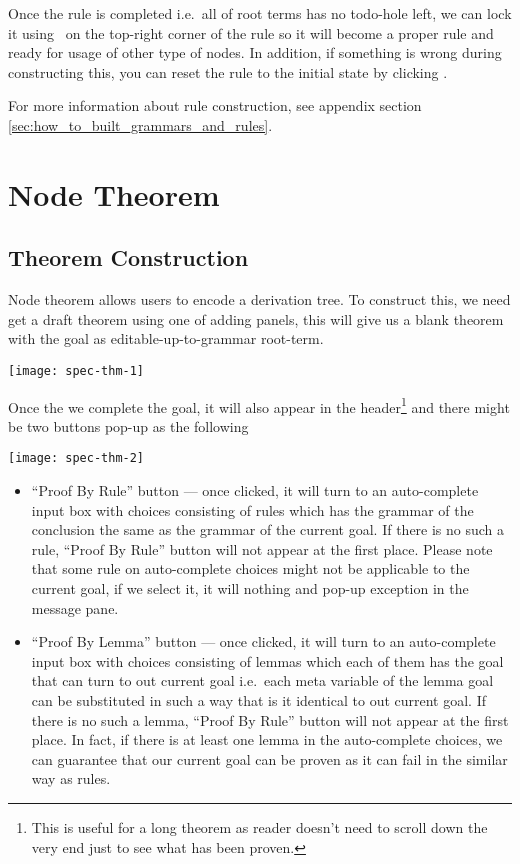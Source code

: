 \documentclass[master.tex]{subfiles}
\begin{document}
Once the rule is completed i.e.\ all of root terms has no todo-hole left, we can
lock it using \lockButton\ on the top-right corner of the rule so it will
become a proper rule and ready for usage of other type of nodes. In addition,
if something is wrong during constructing this, you can reset the rule to the
initial state by clicking \resetButton.

For more information about rule construction, see appendix section
\ref{sec:how_to_built_grammars_and_rules}.

\section{Node Theorem}

\subsection{Theorem Construction}

Node theorem allows users to encode a derivation tree. To construct this, we
need get a draft theorem using one of adding panels, this will give us a blank
theorem with the goal as editable-up-to-grammar root-term.

\begin{center}
\texttt{[image: spec-thm-1]}
\end{center}

Once the we complete the goal, it will also appear in the header\footnote{This
  is useful for a long theorem as reader doesn't need to scroll down the very
  end just to see what has been proven.} and there might be two buttons pop-up
as the following

\begin{center}
\texttt{[image: spec-thm-2]}
\end{center}

\begin{itemize}
\item ``Proof By Rule'' button --- once clicked, it will turn to an
  auto-complete input box with choices consisting of rules which has the grammar
  of the conclusion the same as the grammar of the current goal. If there is no
  such a rule, ``Proof By Rule'' button will not appear at the first place.
  Please note that some rule on auto-complete choices might not be applicable to
  the current goal, if we select it, it will nothing and pop-up exception in the
  message pane.
\item ``Proof By Lemma'' button --- once clicked, it will turn to an
  auto-complete input box with choices consisting of lemmas which each of them
  has the goal that can turn to out current goal i.e.\ each meta variable of the
  lemma goal can be substituted in such a way that is it identical to out
  current goal. If there is no such a lemma, ``Proof By Rule'' button will not
  appear at the first place. In fact, if there is at least one lemma in the
  auto-complete choices, we can guarantee that our current goal can be proven as
  it can fail in the similar way as rules.
\end{itemize}
\end{document}
